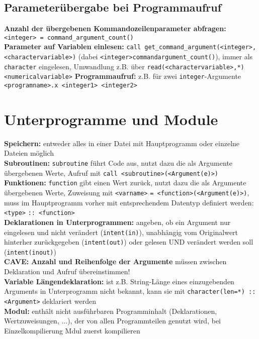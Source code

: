 \documentclass[a4paper, twocolumn]{scrarticle}
\begin{document}
\subsection{Parameterübergabe bei Programmaufruf}
\textbf{Anzahl der übergebenen Kommandozeilenparameter abfragen:} \lstinline|<integer> = command_argument_count()|\\
\textbf{Parameter auf Variablen einlesen:} \lstinline|call get_command_argument(<integer>, <charactervariable>)| (dabei \lstinline|<integer>|\overset{!}{\leq}\lstinline|commandargument_count()|), immer als \lstinline|character| eingelesen, Umwandlung z.B. über \lstinline|read(<charactervariable>,*) <numericalvariable>|
\textbf{Programmaufruf:} z.B. für zwei \lstinline|integer|-Argumente \lstinline[bash]|<programname>.x <integer1> <integer2>|

\section{Unterprogramme und Module}
\textbf{Speichern:} entweder alles in einer Datei mit Hauptprogramm oder einzelne Dateien möglich\\
\textbf{Subroutinen:} \lstinline|subroutine| führt Code aus, nutzt dazu die als Argumente übergebenen Werte, Aufruf mit \lstinline|call <subroutine>(<Argument(e)>)|\\
\textbf{Funktionen:} \lstinline|function| gibt einen Wert zurück, nutzt dazu die als Argumente übergebenen Werte, Zuweisung mit \lstinline|<varname>| \lstinline|= <function>(<Argument(e)>)|, muss im Hauptprogramm vorher mit entsprechendem Datentyp definiert werden: \lstinline|<type>| \lstinline|:: <function>|\\
\textbf{Deklarationen in Unterprogrammen:}  angeben, ob ein Argument nur eingelesen und nicht verändert (\lstinline|intent(in)|), unabhängig vom Originalwert hinterher zurückgegeben (\lstinline|intent(out)|) oder gelesen UND verändert werden soll (\lstinline|intent(inout)|)\\
\textbf{CAVE:} \textbf{Anzahl und Reihenfolge der Argumente} müssen zwischen Deklaration und Aufruf übereinstimmen!\\
\textbf{Variable Längendeklaration:} ist z.B. String-Länge  eines einzugebenden Arguments in Unterprogramm nicht bekannt, kann sie mit \lstinline|character(len=*) :: <Argument>| deklariert werden\\
\textbf{Modul:} enthält nicht ausführbaren  Programminhalt (Deklarationen, Wertzuweisungen, ...), der von allen Programmteilen genutzt wird, bei Einzelkompilierung  Mdul zuerst kompilieren\\
\end{document}
